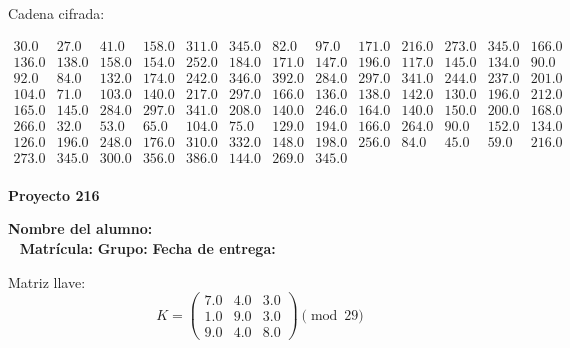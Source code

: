\documentclass[12pt]{article}
\begin{document}
Cadena cifrada:
\begin{center}
$\begin{array}{lllllllllllll}
30.0 & 27.0 & 41.0 & 158.0 & 311.0 & 345.0 & 82.0 & 97.0 & 171.0 & 216.0 & 273.0 & 345.0 & 166.0\\
136.0 & 138.0 & 158.0 & 154.0 & 252.0 & 184.0 & 171.0 & 147.0 & 196.0 & 117.0 & 145.0 & 134.0 & 90.0\\
92.0 & 84.0 & 132.0 & 174.0 & 242.0 & 346.0 & 392.0 & 284.0 & 297.0 & 341.0 & 244.0 & 237.0 & 201.0\\
104.0 & 71.0 & 103.0 & 140.0 & 217.0 & 297.0 & 166.0 & 136.0 & 138.0 & 142.0 & 130.0 & 196.0 & 212.0\\
165.0 & 145.0 & 284.0 & 297.0 & 341.0 & 208.0 & 140.0 & 246.0 & 164.0 & 140.0 & 150.0 & 200.0 & 168.0\\
266.0 & 32.0 & 53.0 & 65.0 & 104.0 & 75.0 & 129.0 & 194.0 & 166.0 & 264.0 & 90.0 & 152.0 & 134.0\\
126.0 & 196.0 & 248.0 & 176.0 & 310.0 & 332.0 & 148.0 & 198.0 & 256.0 & 84.0 & 45.0 & 59.0 & 216.0\\
273.0 & 345.0 & 300.0 & 356.0 & 386.0 & 144.0 & 269.0 & 345.0\\
\end{array}$
\end{center}

\newpage


\textbf{Proyecto 216}

\textbf{Nombre del alumno:} \underline{\hspace{13cm}}\\\
\vspace{1cm}
\textbf{Matrícula:} \underline{\hspace{4cm}} \hspace{1cm}
\textbf{Grupo:} \underline{\hspace{2cm}}
\textbf{Fecha de entrega:} \underline{\hspace{2cm}}

\medskip

Matriz llave:
\[
K = \begin{pmatrix}
7.0 & 4.0 & 3.0\\
1.0 & 9.0 & 3.0\\
9.0 & 4.0 & 8.0
\end{pmatrix} \pmod{29}
\]
\end{document}
